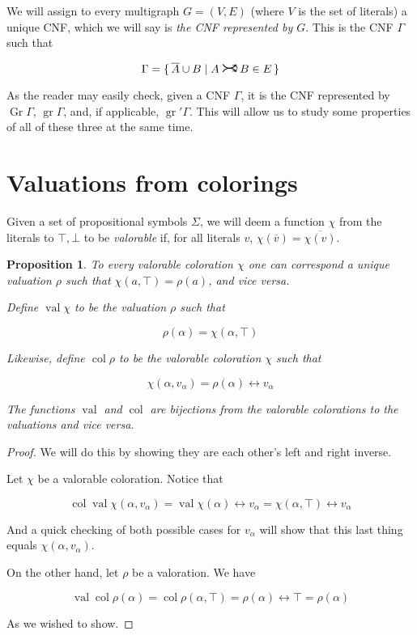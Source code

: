 \documentclass[11pt]{article}
\newcommand{\conj}[1]{\overline{#1}}
\DeclareMathOperator{\gr}{gr}
\DeclareMathOperator{\Gr}{Gr}
\DeclareMathOperator{\val}{val}
\DeclareMathOperator{\col}{col}
\newcommand{\rightcurvearrow}{
\mathrel{
  \begin{tikzpicture}[scale=0.8]
    \draw[thick,->] (0,1ex) arc (30:150:-2ex);
    \draw[thick,->] (0,-1ex) arc (150:30:2ex);
  \end{tikzpicture}
}
}
\newtheorem{prop}{Proposition}
\begin{document}
We will assign to every multigraph $G = (V,E)$ (where $V$ is the set of literals) a unique CNF, which we will say is \emph{the CNF represented by $G$}. This is the CNF $\Gamma$ such that

\[\Gamma = \{\, \conj A \cup B \mid A \rightcurvearrow B \in E\,\}\]

As the reader may easily check, given a CNF $\Gamma$, it is the CNF represented by $\Gr \Gamma$, $\gr \Gamma$, and, if applicable, $\gr'\Gamma$. This will allow us to study some properties of all of these three at the same time.

\section{Valuations from colorings}

Given a set of propositional symbols $\Sigma$, we will deem a function $\chi$ from the literals to $\top, \bot$ to be \emph{valorable} if, for all literals $v$, $\chi(\conj v) = \conj{\chi(v)}$.

\begin{prop}
To every valorable coloration $\chi$ one can correspond a unique valuation $\rho$ such that $\chi(a, \top) = \rho(a)$, and vice versa.

Define $\val \chi$ to be the valuation $\rho$ such that

\[\rho(\alpha) = \chi(\alpha, \top)\]

Likewise, define $\col \rho$ to be the valorable coloration $\chi$ such that

\[\chi(\alpha, v_\alpha) = \rho(\alpha) \leftrightarrow v_\alpha\]

The functions $\val$ and $\col$ are bijections from the valorable colorations to the valuations and vice versa.
\end{prop}

\begin{proof}
We will do this by showing they are each other's left and right inverse.

Let $\chi$ be a valorable coloration. Notice that

\[\col \val \chi (\alpha, v_\alpha) = \val \chi (\alpha) \leftrightarrow v_\alpha = \chi(\alpha, \top) \leftrightarrow v_\alpha\]

And a quick checking of both possible cases for $v_\alpha$ will show that this last thing equals $\chi(\alpha, v_\alpha)$.

On the other hand, let $\rho$ be a valoration. We have

\[\val \col \rho(\alpha) = \col \rho (\alpha, \top) = \rho(\alpha) \leftrightarrow \top = \rho(\alpha) \]

As we wished to show.
\end{proof}
\end{document}
